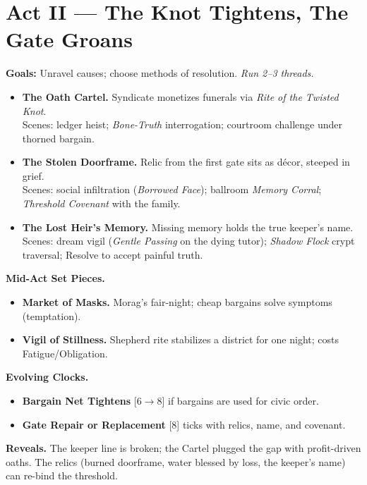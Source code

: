 \documentclass[11pt]{article}
\newcommand{\clock}[1]{\textsc{[#1]}}
\begin{document}
\section*{Act II --- The Knot Tightens, The Gate Groans}
\textbf{Goals:} Unravel causes; choose methods of resolution. \emph{Run 2--3 threads.}
\begin{itemize}
  \item \textbf{The Oath Cartel.} Syndicate monetizes funerals via \textit{Rite of the Twisted Knot}.\\
  Scenes: ledger heist; \textit{Bone-Truth} interrogation; courtroom challenge under thorned bargain.
  \item \textbf{The Stolen Doorframe.} Relic from the first gate sits as décor, steeped in grief.\\
  Scenes: social infiltration (\textit{Borrowed Face}); ballroom \textit{Memory Corral}; \textit{Threshold Covenant} with the family.
  \item \textbf{The Lost Heir's Memory.} Missing memory holds the true keeper's name.\\
  Scenes: dream vigil (\textit{Gentle Passing} on the dying tutor); \textit{Shadow Flock} crypt traversal; Resolve to accept painful truth.
\end{itemize}
\textbf{Mid-Act Set Pieces.}
\begin{itemize}
  \item \textbf{Market of Masks.} Morag's fair-night; cheap bargains solve symptoms (temptation).
  \item \textbf{Vigil of Stillness.} Shepherd rite stabilizes a district for one night; costs Fatigue/Obligation.
\end{itemize}
\textbf{Evolving Clocks.}
\begin{itemize}
  \item \textbf{Bargain Net Tightens} \clock{6$\to$8} if bargains are used for civic order.
  \item \textbf{Gate Repair or Replacement} \clock{8} ticks with relics, name, and covenant.
\end{itemize}
\textbf{Reveals.} The keeper line is broken; the Cartel plugged the gap with profit-driven oaths. The relics (burned doorframe, water blessed by loss, the keeper's name) can re-bind the threshold.
\end{document}

